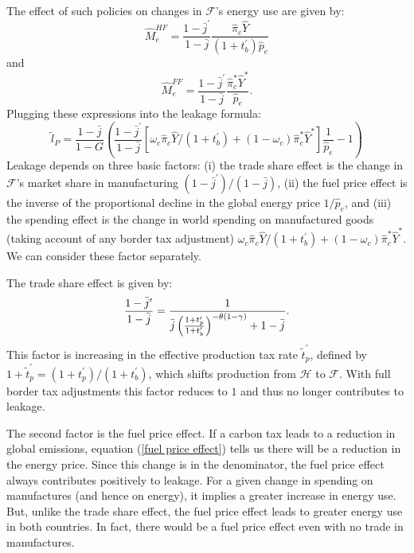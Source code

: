 \documentclass[notitlepage,12pt]{article}
\begin{document}
The effect of such policies on changes in $\mathcal{F}$'s energy use are
given by:%
\begin{equation*}
\hat{M}_{e}^{HF}=\frac{1-\bar{j}^{\prime }}{1-\bar{j}}\frac{\hat{\pi}_{c}%
\hat{Y}}{\left( 1+t_{b}^{\prime }\right) \hat{p}_{e}}
\end{equation*}%
and%
\begin{equation*}
\hat{M}_{e}^{FF}=\frac{1-\bar{j}^{\prime }}{1-\bar{j}}\frac{\hat{\pi}%
_{c}^{\ast }\hat{Y}^{\ast }}{\hat{p}_{e}}.
\end{equation*}%
Plugging these expressions into the leakage formula:%
\begin{equation*}
\tilde{l}_{P}=\frac{1-\bar{j}}{1-G}\left( \frac{1-\bar{j}^{\prime }}{1-\bar{j%
}}\left[ \omega _{c}\hat{\pi}_{c}\hat{Y}/\left( 1+t_{b}^{\prime }\right)
+\left( 1-\omega _{c}\right) \hat{\pi}_{c}^{\ast }\hat{Y}^{\ast }\right] 
\frac{1}{\hat{p}_{e}}-1\right) 
\end{equation*}%
Leakage depends on three basic factors: (i) the trade share effect is the
change in $\mathcal{F}$'s market share in manufacturing $\left( 1-\bar{j}%
^{\prime }\right) /\left( 1-\bar{j}\right) $, (ii) the fuel price effect is
the inverse of the proportional decline in the global energy price $1/\hat{p}%
_{e}$, and (iii) the spending effect is the change in world spending on
manufactured goods (taking account of any border tax adjustment) $\omega _{c}%
\hat{\pi}_{c}\hat{Y}/\left( 1+t_{b}^{\prime }\right) +\left( 1-\omega
_{c}\right) \hat{\pi}_{c}^{\ast }\hat{Y}^{\ast }$. We can consider these
factor separately.

The trade share effect is given by:%
\begin{equation*}
\frac{1-\bar{j}^{\prime }}{1-\bar{j}}=\frac{1}{\bar{j}\left( \frac{%
1+t_{p}^{\prime }}{1+t_{b}^{\prime }}\right) ^{-\theta \left( 1-\gamma
\right) }+1-\bar{j}}.
\end{equation*}%
This factor is increasing in the effective production tax rate $\tilde{t}%
_{p}^{\prime }$, defined by $1+\tilde{t}_{p}^{\prime }=(1+t_{p}^{\prime
})/(1+t_{b}^{\prime })$, which shifts production from $\mathcal{H}$ to $%
\mathcal{F}$. With full border tax adjustments this factor reduces to $1$
and thus no longer contributes to leakage.

The second factor is the fuel price effect. If a carbon tax leads to a
reduction in global emissions, equation (\ref{fuel price effect}) tells us
there will be a reduction in the energy price. Since this change is in the
denominator, the fuel price effect always contributes positively to leakage.
For a given change in spending on manufactures (and hence on energy), it
implies a greater increase in energy use. But, unlike the trade share
effect, the fuel price effect leads to greater energy use in both countries.
In fact, there would be a fuel price effect even with no trade in
manufactures.
\end{document}
